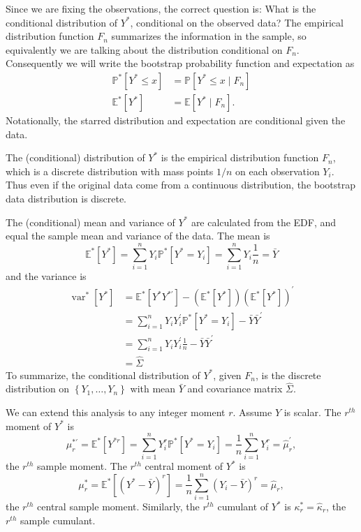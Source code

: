 \documentclass[10pt]{article}
\begin{document}
Since we are fixing the observations, the correct question is: What is the conditional distribution of $Y^{*}$, conditional on the observed data? The empirical distribution function $F_{n}$ summarizes the information in the sample, so equivalently we are talking about the distribution conditional on $F_{n}$. Consequently we will write the bootstrap probability function and expectation as
$$
\begin{aligned}
\mathbb{P}^{*}\left[Y^{*} \leq x\right] &=\mathbb{P}\left[Y^{*} \leq x \mid F_{n}\right] \\
\mathbb{E}^{*}\left[Y^{*}\right] &=\mathbb{E}\left[Y^{*} \mid F_{n}\right] .
\end{aligned}
$$
Notationally, the starred distribution and expectation are conditional given the data.

The (conditional) distribution of $Y^{*}$ is the empirical distribution function $F_{n}$, which is a discrete distribution with mass points $1 / n$ on each observation $Y_{i}$. Thus even if the original data come from a continuous distribution, the bootstrap data distribution is discrete.

The (conditional) mean and variance of $Y^{*}$ are calculated from the EDF, and equal the sample mean and variance of the data. The mean is
$$
\mathbb{E}^{*}\left[Y^{*}\right]=\sum_{i=1}^{n} Y_{i} \mathbb{P}^{*}\left[Y^{*}=Y_{i}\right]=\sum_{i=1}^{n} Y_{i} \frac{1}{n}=\bar{Y}
$$
and the variance is
$$
\begin{aligned}
\operatorname{var}^{*}\left[Y^{*}\right] &=\mathbb{E}^{*}\left[Y^{*} Y^{* \prime}\right]-\left(\mathbb{E}^{*}\left[Y^{*}\right]\right)\left(\mathbb{E}^{*}\left[Y^{*}\right]\right)^{\prime} \\
&=\sum_{i=1}^{n} Y_{i} Y_{i}^{\prime} \mathbb{P}^{*}\left[Y^{*}=Y_{i}\right]-\bar{Y} \bar{Y}^{\prime} \\
&=\sum_{i=1}^{n} Y_{i} Y_{i}^{\prime} \frac{1}{n}-\bar{Y} \bar{Y}^{\prime} \\
&=\widehat{\Sigma}
\end{aligned}
$$
To summarize, the conditional distribution of $Y^{*}$, given $F_{n}$, is the discrete distribution on $\left\{Y_{1}, \ldots, Y_{n}\right\}$ with mean $\bar{Y}$ and covariance matrix $\widehat{\Sigma}$.

We can extend this analysis to any integer moment $r$. Assume $Y$ is scalar. The $r^{t h}$ moment of $Y^{*}$ is
$$
\mu_{r}^{* \prime}=\mathbb{E}^{*}\left[Y^{* r}\right]=\sum_{i=1}^{n} Y_{i}^{r} \mathbb{P}^{*}\left[Y^{*}=Y_{i}\right]=\frac{1}{n} \sum_{i=1}^{n} Y_{i}^{r}=\widehat{\mu}_{r}^{\prime},
$$
the $r^{t h}$ sample moment. The $r^{t h}$ central moment of $Y^{*}$ is
$$
\mu_{r}^{*}=\mathbb{E}^{*}\left[\left(Y^{*}-\bar{Y}\right)^{r}\right]=\frac{1}{n} \sum_{i=1}^{n}\left(Y_{i}-\bar{Y}\right)^{r}=\widehat{\mu}_{r},
$$
the $r^{t h}$ central sample moment. Similarly, the $r^{t h}$ cumulant of $Y^{*}$ is $\kappa_{r}^{*}=\widehat{\kappa}_{r}$, the $r^{t h}$ sample cumulant.
\end{document}
